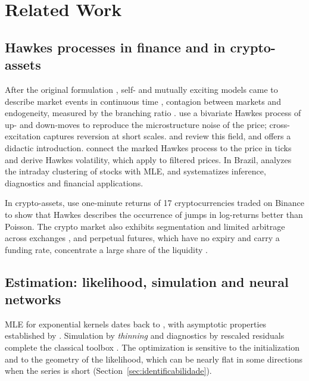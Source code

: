\chapter{Related Work}

\section{Hawkes processes in finance and in crypto-assets}

After the original formulation \citep{hawkes1971,hawkes1971b}, self- and mutually
exciting models came to describe market events in continuous time
\citep{bowsher2007,embrechts2011}, contagion between markets \citep{aitsahalia2015}
and endogeneity, measured by the branching ratio \citep{filimonov2012,hardiman2013}.
\citet{bacry2013} use a bivariate Hawkes process of up- and down-moves to reproduce
the microstructure noise of the price; cross-excitation captures reversion at short
scales. \citet{bacry2015} and \citet{hawkes2018} review this field, and
\citet{mutoke2011} offers a didactic introduction. \citet{leeseo2017} connect the
marked Hawkes process to the price in ticks and derive Hawkes volatility, which
\citet{lee2024} apply to filtered prices. In Brazil, \citet{primo2018} analyzes the
intraday clustering of stocks with MLE, and \citet{silva2026} systematizes inference,
diagnostics and financial applications.

In crypto-assets, \citet{taddeo2024} use one-minute returns of 17 cryptocurrencies traded on
Binance to show that Hawkes describes the occurrence of jumps in log-returns
better than Poisson. The crypto market also exhibits segmentation and limited
arbitrage across exchanges \citep{makarov2020}, and perpetual futures, which have no
expiry and carry a funding rate, concentrate a large share of the liquidity
\citep{he2022perpetual}.

\section{Estimation: likelihood, simulation and neural networks}

MLE for exponential kernels dates back to \citet{ozaki1979}, with asymptotic
properties established by \citet{ogata1978}. Simulation by \emph{thinning}
\citep{ogata1981} and diagnostics by rescaled residuals \citep{ogata1988,brown2002}
complete the classical toolbox \citep{laub2021}. The optimization is sensitive to the
initialization and to the geometry of the likelihood, which can be nearly flat in
some directions when the series is short (Section~\ref{sec:identificabilidade}).

